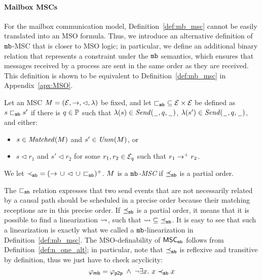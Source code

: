 \paragraph{\bf Mailbox MSCs}
For the mailbox communication model, Definition~\ref{def:mb_msc} cannot be easily translated into an MSO formula. Thus, we introduce an alternative definition of $\mathtt{mb}$-MSC that is closer to MSO logic; in particular, we define an additional binary relation that represents a constraint under the $\mathtt{mb}$ semantics, which ensures that messages received by a process are sent in the same order as they are received. This definition is shown to be equivalent to Definition~\ref{def:mb_msc} in Appendix~\ref{apx:MSO}.

\begin{definition} \label{def:n_one_alt}
	Let an MSC $M = (\mathcal{E},\to,\lhd,\lambda)$ be fixed, and let ${\sqsubset_{\mathtt{mb}}} \subseteq \mathcal{E} \times \mathcal{E}$
	be defined as $s \sqsubset_{\mathtt{mb}} s'$ if there is $q \in \mathbb{P}$
	such that $\lambda(s) \in {\mathit{Send}(\hspace{0.1em}\underline{\hspace{0.5em}}\hspace{0.1em},q,\hspace{0.1em}\underline{\hspace{0.5em}}\hspace{0.1em})}$,
	$\lambda(s') \in {\mathit{Send}(\hspace{0.1em}\underline{\hspace{0.5em}}\hspace{0.1em},q,\hspace{0.1em}\underline{\hspace{0.5em}}\hspace{0.1em})}$, and either:
	\begin{itemize}%
		\item $s \in \mathit{Matched}(M)$ and $s' \in \mathit{Unm}(M)$, or
		\item $s \lhd r_1$ and $s' \lhd r_2$ for some $r_1,r_2 \in \mathcal{E}_q$ such that $r_1 \to^+ r_2$.
	\end{itemize}

	We let ${\prec_{\mathtt{mb}}} = ({\to} \,\cup\, {\lhd} \,\cup\, {\sqsubset_{\mathtt{mb}}})^+$.
	$M $ is a \emph{$\mathtt{mb}$-MSC}
	if ${\preceq_{\mathtt{mb}}}$ is a partial order.
\end{definition}
The ${\sqsubset_{\mathtt{mb}}}$ relation expresses that two send events that are not necessarily related by a causal path should be scheduled in a precise order because their matching receptions are in this precise order. If ${\preceq_{\mathtt{mb}}}$ is a partial order, it means that it is possible to find a linearization $\rightsquigarrow$, such that $\rightsquigarrow \;\subseteq\; \preceq_{\mathtt{mb}}$. It is easy to see that such a linearization is exactly what we called a $\mathtt{mb}$-linearization in Definition~\ref{def:mb_msc}.
The MSO-definability of $\mathsf{MSC}_{\mathtt{mb}}$ follows from Definition~\ref{def:n_one_alt}; in particular, note that 
$\preceq_{\mathtt{mb}}$ is reflexive and transitive by definition, 
thus we just have to check acyclicity:
\[
	\varphi_{\mathsf{mb}} = \varphi_{\mathsf{p2p}} \;\wedge\; \neg \exists x.\ x \prec_{\mathtt{mb}} x 
\]

